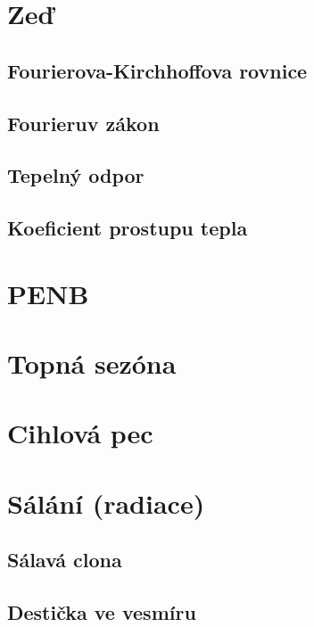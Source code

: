 \documentclass{article}
\begin{document}



\maketitle
\tableofcontents
\newpage



\section{Zeď \spicy \spicy}


\subsection{Fourierova-Kirchhoffova rovnice \spicy \spicy \spicy}


\subsection{Fourieruv zákon \spicy \spicy \spicy}


\subsection{Tepelný odpor}


\subsection{Koeficient prostupu tepla}



\section{PENB \spicy \spicy \spicy}



\section{Topná sezóna \spicy \spicy \spicy}



\section{Cihlová pec \spicy \spicy \spicy \spicy}



\section{Sálání (radiace) \spicy \spicy}


\subsection{Sálavá clona}


\subsection{Destička ve vesmíru}
\end{document}

